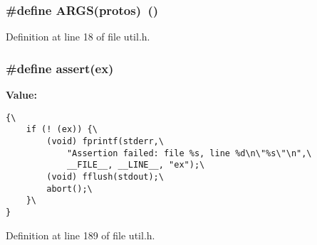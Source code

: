\subsubsection{\setlength{\rightskip}{0pt plus 5cm}\#define ARGS(protos)~()}\label{util_8h_c567d4fddb379109f084370bc6947492}




Definition at line 18 of file util.h.
\subsubsection{\setlength{\rightskip}{0pt plus 5cm}\#define assert(ex)}\label{util_8h_07d17d6d5d1074c0969bc5d3c3d1d84a}


\textbf{Value:}

\begin{Code}\begin{verbatim}{\
    if (! (ex)) {\
        (void) fprintf(stderr,\
            "Assertion failed: file %s, line %d\n\"%s\"\n",\
            __FILE__, __LINE__, "ex");\
        (void) fflush(stdout);\
        abort();\
    }\
}
\end{verbatim}\end{Code}


Definition at line 189 of file util.h.

